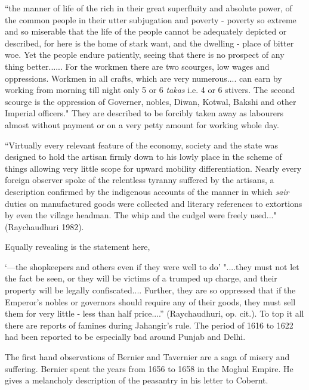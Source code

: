 \begin{myquote}
``the manner of life of the rich in their great superfluity and absolute power, of the common people in their utter subjugation and poverty - poverty so extreme and so miserable that the life of the people cannot be adequately depicted or described, for here is the home of stark want, and the dwelling - place of bitter woe. Yet the people endure patiently, seeing that there is no prospect of any thing better...... For the workmen there are two scourges, low wages and oppressions. Workmen in all crafts, which are very numerous.... can earn by working from morning till night only 5 or 6 \textit{takas} i.e. 4 or 6 stivers. The second scourge is the oppression of Governer, nobles, Diwan, Kotwal, Bakshi and other Imperial officers." They are described to be forcibly taken away as labourers almost without payment or on a very petty amount for working whole day.
\end{myquote}

\begin{myquote}
``Virtually every relevant feature of the economy, society and the state was designed to hold the artisan firmly down to his lowly place in the scheme of things allowing very little scope for upward mobility differentiation. Nearly every foreign observer spoke of the relentless tyranny suffered by the artisans, a description confirmed by the indigenous accounts of the manner in which \textit{sair} duties on manufactured goods were collected and literary references to extortions by even the village headman. The whip and the cudgel were freely used..." (Raychaudhuri 1982).
\end{myquote}

Equally revealing is the statement here,

\begin{myquote}
`---the shopkeepers and others even if they were well to do' "....they must not let the fact be seen, or they will be victims of a trumped up charge, and their property will be legally confiscated.... Further, they are so oppressed that if the Emperor's nobles or governors should require any of their goods, they must sell them for very little - less than half price....'' (Raychaudhuri, op. cit.). To top it all there are reports of famines during Jahangir's rule. The period of 1616 to 1622 had been reported to be especially bad around Punjab and Delhi.
\end{myquote}

The first hand observations of Bernier and Tavernier are a saga of misery and suffering. Bernier spent the years from 1656 to 1658 in the Moghul Empire. He gives a melancholy description of the peasantry in his letter to Cobernt.

